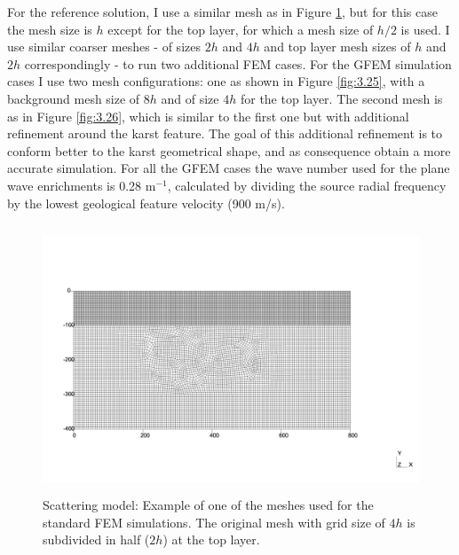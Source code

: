 For the reference solution, I use a similar mesh as in Figure \ref{fig:3.24}, but for this case the mesh size is $h$ except for the top layer, for which a mesh size of $h/2$ is used. I use similar coarser meshes - of sizes $2h$ and $4h$ and top layer mesh sizes of $h$ and $2h$ correspondingly -  to run two additional FEM cases. 
For the GFEM simulation cases I use two mesh configurations: one as shown in Figure \ref{fig:3.25}, with a background mesh size of $8h$ and of size $4h$ for the top layer. The second mesh  is as in Figure \ref{fig:3.26}, which is similar to the first one but with additional refinement around the karst feature. The goal of this additional refinement is to conform better to the karst geometrical shape, and as consequence obtain a more accurate simulation. For all the GFEM cases the wave number used for the plane wave enrichments is 0.28 m$^{-1}$, calculated by dividing the source radial frequency by the lowest geological feature velocity (900 m/s).

 \begin{figure}[h!]
	\centering
	\includegraphics[width=16cm, height=8cm]{Thesis_Edith/figures/scattering/mesh_ref_mr4_v2.pdf}
	\caption{Scattering model: Example of one of the meshes used for the  standard FEM simulations. The original mesh with grid size of $4h$ is subdivided in half ($2h$) at the top layer.}
	\label{fig:3.24}
\end{figure}


